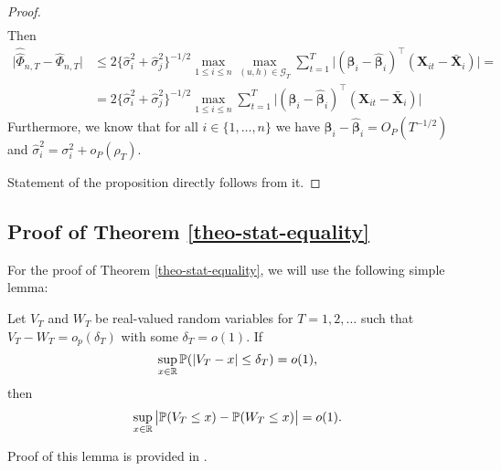 \documentclass[a4paper,12pt]{article}
\newcommand{\doublehattwo}[1]{\widehat{\widehat{#1}}}
\begin{document}
\begin{proof}
\begin{align*}
\end{align*}
Then
\begin{align*}
\big| \doublehattwo{\Phi}_{n, T} - \widehat{\Phi}_{n, T} \big| &\le 2 \{\widehat{\sigma}_i^2 + \widehat{\sigma}_j^2 \}^{-1/2} \max_{1\le i \le n} \max_{(u,h) \in \mathcal{G}_T}\sum_{t=1}^T \big| (\bm{\beta}_i - \widehat{\bm{\beta}}_i)^\top (\mathbf{X}_{it} - \bar{\mathbf{X}}_{i}) \big| = \\
&= 2 \{\widehat{\sigma}_i^2 + \widehat{\sigma}_j^2 \}^{-1/2} \max_{1\le i \le n} \sum_{t=1}^T \big| (\bm{\beta}_i - \widehat{\bm{\beta}}_i)^\top (\mathbf{X}_{it} - \bar{\mathbf{X}}_{i}) \big|
\end{align*}
Furthermore, we know that for all $i \in \{1, \ldots, n\}$ we have $\bm{\beta}_i - \widehat{\bm{\beta}}_i = O_P(T^{-1/2})$ and $\widehat{\sigma}_i^2 = \sigma_i^2 + o_P(\rho_T)$.

 
Statement of the proposition directly follows from it.
\end{proof}


\subsection*{Proof of Theorem \ref{theo-stat-equality}}

For the proof of Theorem \ref{theo-stat-equality}, we will use the following simple lemma: 
\begin{lemmaA}\label{lemma1-theo-stat}
Let $V_T$ and $W_T$ be real-valued random variables for $T = 1,2,\ldots$ such that $V_T - W_T = o_p(\delta_T)$ with some $\delta_T = o(1)$. If 
\begin{equation}\label{eq-lemma1-cond}
\sup_{x \in \mathbb{R}} \mathbb{P}(|V_T - x| \le \delta_T) = o(1), 
\end{equation}
then 
\begin{equation}\label{eq-lemma1-statement}
\sup_{x \in \mathbb{R}} \big| \mathbb{P}(V_T \le x) - \mathbb{P}(W_T \le x) \big| = o(1). 
\end{equation}
\end{lemmaA}
Proof of this lemma is provided in \cite*{KhismatullinaVogt2018}.
\end{document}
